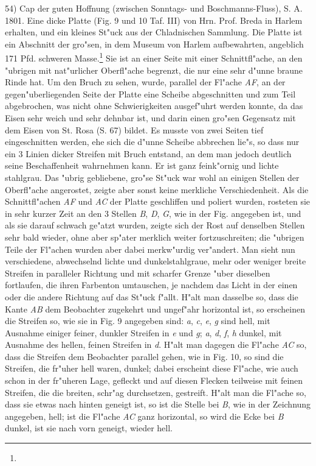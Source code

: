 \documentclass[a4paper, 11pt, oneside]{article}
\begin{document}
54) Cap der guten Hoffnung (zwischen Sonntags- und Boschmanns-Fluss), S. A. 1801. Eine dicke Platte (Fig. 9 und 10 Taf. III) von Hrn. Prof. Breda in Harlem erhalten, und ein kleines St"uck aus der Chladnischen Sammlung. Die Platte ist ein Abschnitt der gro"sen, in dem Museum von Harlem aufbewahrten, angeblich 171 Pfd. schweren Masse.\footnote{} Sie ist an einer Seite mit einer Schnittfl"ache, an den "ubrigen mit nat"urlicher Oberfl"ache begrenzt, die nur eine sehr d"unne braune Rinde hat. Um den Bruch zu sehen, wurde, parallel der Fl"ache \emph{AF}, an der gegen"uberliegenden Seite der Platte eine Scheibe abgeschnitten und zum Teil abgebrochen, was nicht ohne Schwierigkeiten ausgef"uhrt werden konnte, da das Eisen sehr weich und sehr dehnbar ist, und darin einen gro"sen Gegensatz mit dem Eisen von St. Rosa (S. 67) bildet. Es musste von zwei Seiten tief eingeschnitten werden, ehe sich die d"unne Scheibe abbrechen lie"s, so dass nur ein 3 Linien dicker Streifen mit Bruch entstand, an dem man jedoch deutlich seine Beschaffenheit wahrnehmen kann. Er ist ganz feink"ornig und lichte stahlgrau. Das "ubrig gebliebene, gro"se St"uck war wohl an einigen Stellen der Oberfl"ache angerostet, zeigte aber sonst keine merkliche Verschiedenheit. Als die Schnittfl"achen \emph{AF} und \emph{AC} der Platte geschliffen und poliert wurden, rosteten sie in sehr kurzer Zeit an den 3 Stellen \emph{B}, \emph{D}, \emph{G}, wie in der Fig. angegeben ist, und als sie darauf schwach ge"atzt wurden, zeigte sich der Rost auf denselben Stellen sehr bald wieder, ohne aber sp"ater merklich weiter fortzuschreiten; die "ubrigen Teile der Fl"achen wurden aber dabei merkw"urdig ver"andert. Man sieht nun verschiedene, abwechselnd lichte und dunkelstahlgraue, mehr oder weniger breite Streifen in paralleler Richtung und mit scharfer Grenze "uber dieselben fortlaufen, die ihren Farbenton umtauschen, je nachdem das Licht in der einen oder die andere Richtung auf das St"uck f"allt. H"alt man dasselbe so, dass die Kante \emph{AB} dem Beobachter zugekehrt und ungef"ahr horizontal ist, so erscheinen die Streifen so, wie sie in Fig. 9 angegeben sind: \emph{a}, \emph{c}, \emph{e}, \emph{g} sind hell, mit Ausnahme einiger feiner, dunkler Streifen in \emph{e} und \emph{g}; \emph{a}, \emph{d}, \emph{f}, \emph{h} dunkel, mit Ausnahme des hellen, feinen Streifen in \emph{d}. H"alt man dagegen die Fl"ache \emph{AC} so, dass die Streifen dem Beobachter parallel gehen, wie in Fig. 10, so sind die Streifen, die fr"uher hell waren, dunkel; dabei erscheint diese Fl"ache, wie auch schon in der fr"uheren Lage, gefleckt und auf diesen Flecken teilweise mit feinen Streifen, die die breiten, schr"ag durchsetzen, gestreift. H"alt man die Fl"ache so, dass sie etwas nach hinten geneigt ist, so ist die Stelle bei \emph{B}, wie in der Zeichnung angegeben, hell; ist die Fl"ache \emph{AC} ganz horizontal, so wird die Ecke bei \emph{B} dunkel, ist sie nach vorn geneigt, wieder hell.
\end{document}
